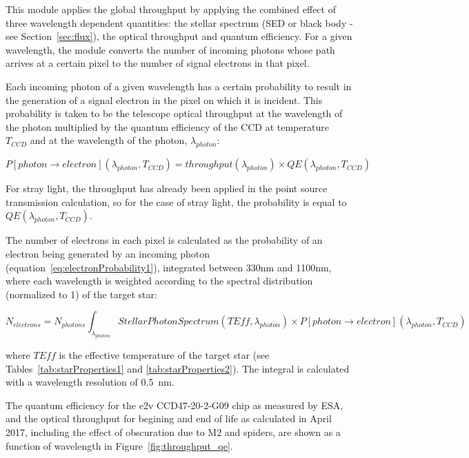 \documentclass[11pt]{article}      %
\begin{document}
This module applies the global throughput by applying the combined effect of three wavelength dependent quantities: the stellar spectrum (SED or black body - see Section~\ref{sec:flux}), the optical throughput and quantum efficiency. For a given wavelength, the module converts the number of incoming photons whose path arrives at a certain pixel to the number of signal electrons in that pixel.

Each incoming photon of a given wavelength has a certain probability to result in the generation of a signal electron in the pixel on which it is incident.  This probability is taken to be the telescope optical throughput at the wavelength of the photon multiplied by the quantum efficiency of the CCD at temperature $T_{CCD}$ and at the wavelength of the photon, $\lambda_{photon}$:

\begin{equation}
P[photon\rightarrow electron](\lambda_{photon},T_{CCD}) = throughput(\lambda_{photon}) \times QE(\lambda_{photon},T_{CCD})
\label{eq:electronProbability1}
\end{equation}

For stray light, the throughput has already been applied in the point source transmission calculation, so for the case of stray light, the probability is equal to $QE(\lambda_{photon},T_{CCD})$.

The number of electrons in each pixel is calculated as the probability of an electron being generated by an incoming photon (equation~\ref{eq:electronProbability1}), integrated between 330nm and 1100nm, where each wavelength is weighted according to the spectral distribution (normalized to 1) of the target star:

\begin{equation}
N_{electrons} = N_{photons } \int_{\lambda_{photon}} StellarPhotonSpectrum(TEff,\lambda_{photon}) \times P[photon\rightarrow electron](\lambda_{photon},T_{CCD})
\label{eq:electronProbability2}
\end{equation}

where $TEff$ is the effective temperature of the target star (see Tables~\ref{tab:starProperties1} and \ref{tab:starProperties2}). The integral is calculated with a wavelength resolution of 0.5~nm.

The quantum efficiency for the e2v CCD47-20-2-G09 chip as measured by ESA, and the optical throughput for begining and end of life as calculated in April 2017, including the effect of obscuration due to M2 and spiders, are shown as a function of wavelength in Figure~\ref{fig:throughput_qe}.
\end{document}
